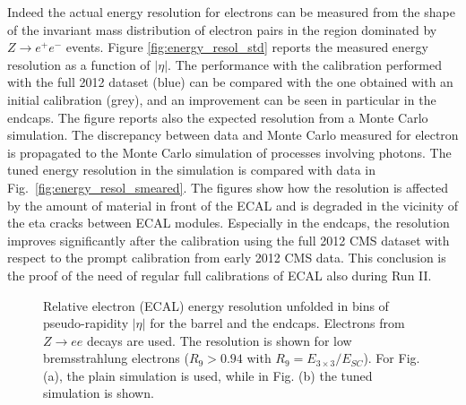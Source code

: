 \documentclass[journal]{IEEEtran}
\begin{document}
Indeed the actual energy resolution for electrons can be measured from the shape of the invariant mass distribution of electron pairs in the region dominated by $Z\to e^+e^-$ events. Figure \ref{fig:energy_resol_std} reports the measured energy resolution as a function of  $\vert\eta\vert$. The performance with the calibration performed with the full 2012 dataset (blue) can be compared with the one obtained with an initial calibration (grey), and an improvement can be seen in particular in the endcaps. The figure reports also the expected resolution from a Monte Carlo simulation. The discrepancy between data and Monte Carlo measured for electron is propagated to the Monte Carlo simulation of processes involving photons. The tuned energy resolution in the simulation is compared with data in Fig.~\ref{fig:energy_resol_smeared}.  The figures show how the resolution is affected by the amount of material in front of the ECAL and is degraded in the vicinity of the eta cracks between ECAL modules.  Especially in the endcaps, the resolution improves significantly after the calibration using the full 2012 CMS dataset with respect to the prompt calibration from early 2012 CMS data. This conclusion is the proof of the need of regular full calibrations of ECAL also during Run II. 
%
\begin{figure}[!t]
  \begin{center}
    \caption{Relative electron (ECAL) energy resolution unfolded in bins of pseudo-rapidity $\vert\eta\vert$ for the barrel and the endcaps. Electrons from $Z\to ee$ decays are used. The resolution is shown for low bremsstrahlung electrons ($R_9>0.94$ with $R_9 = E_{3 \times 3} / E_{SC}$). For Fig. (a), the plain simulation is used, while in Fig. (b) the tuned simulation is shown. ~\label{energy_resol}}
  \end{center}
\end{figure}
%
\end{document}
